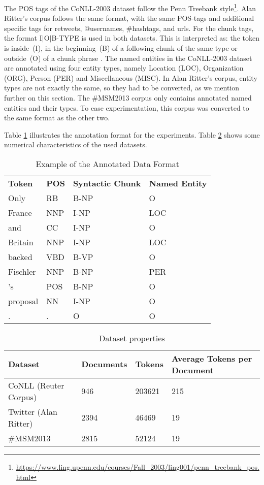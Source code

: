 The POS tags of the CoNLL-2003 dataset follow the Penn Treebank style\footnote{\url{https://www.ling.upenn.edu/courses/Fall_2003/ling001/penn_treebank_pos.html}}.
Alan Ritter's corpus follows the same format, with the same POS-tags and additional specific tags for retweets, @usernames, \#hashtags, and urls.
For the chunk tags, the format I$\vert$O$\vert$B-TYPE is used in both datasets. This is interpreted as: the token is inside~(I), in the beginning~(B) of a following chunk of the same type or outside~(O) of a chunk phrase \citep{ramshaw1995textchunking}.
The named entities in the CoNLL-2003 dataset are annotated using four entity types, namely Location (LOC), Organization (ORG), Person (PER) and Miscellaneous (MISC). In Alan Ritter's corpus, entity types are not exactly the same, so they had to be converted, as we mention further on this section.
The \#MSM2013 corpus only contains annotated named entities and their types. To ease experimentation, this corpus was converted to the same format as the other two.

Table \ref{tab:annotated-data-format} illustrates the annotation format for the experiments. Table \ref{tab:data-char} shows some numerical characteristics of the used datasets.

\begin{table}[H]
\centering
\small
\begin{tabular}{llll}
\textbf{Token} & \textbf{POS} & \textbf{Syntactic Chunk} & \textbf{Named Entity} \\
Only & RB & B-NP & O \\
France & NNP & I-NP & LOC \\
and & CC & I-NP &  O \\
Britain & NNP & I-NP & LOC \\
backed & VBD & B-VP & O \\
Fischler & NNP & B-NP & PER \\
's & POS & B-NP & O \\
proposal & NN & I-NP & O \\
. & . & O & O \\
\end{tabular}
\caption[Example of the Annotated Data Format]{Example of the Annotated Data Format}
\label{tab:annotated-data-format}
\end{table}

\begin{table}[H]
\centering
\small
\begin{tabular}{|l|l|l|l|}
\hline
\textbf{Dataset} & \textbf{Documents} & \textbf{Tokens} & \textbf{Average Tokens per Document}\\ \hline
CoNLL (Reuter Corpus) & 946 & 203621 & 215 \\ \hline
Twitter (Alan Ritter) & 2394 &  46469 & 19 \\ \hline
\#MSM2013 & 2815 & 52124 & 19 \\ \hline
\end{tabular}
\caption[Dataset properties]{Dataset properties}
\label{tab:data-char}
\end{table}

